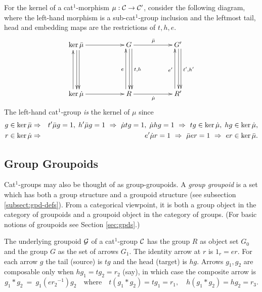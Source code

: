 For the kernel of a cat$^1$-morphism $\mu : \mathcal{C} \to \mathcal{C}'$, 
consider the following diagram, where the left-hand morphism is a 
sub-cat$^1$-group inclusion and the leftmost tail, head and embedding maps 
are the restrictions of $t,h,e$. 
\begin{equation*} \label{eq:cat1kernel}
\vcenter{\xymatrix{
   \ker\barm \ar[rr] \ar[dd]<1.0ex> \ar[dd]<0.2ex> 
     && G \ar[dd]<1.0ex>^{t,h} \ar[dd]<0.2ex> \ar[rr]^{\barm}
          && G' \ar[dd]<1.0ex>^{t',h'} \ar[dd]<0.2ex>  \\
     &&  \\
   \ker\dm \ar[rr] \ar[uu]<1.0ex> 
     && R \ar[uu]<1.0ex>^{e} \ar[rr]_{\dm}
          && R' \ar[uu]<1.0ex>^{e'} 
}}
\end{equation*}
The left-hand cat$^1$-group \emph{is} the kernel of $\mu$ since 
\begin{eqnarray*}
g \in \ker\bar{\mu} 
  & \Rightarrow 
    & t'\bar{\mu} g = 1,\; h'\bar{\mu} g = 1 ~\Rightarrow~ 
      \dot{\mu} tg = 1,\; \dot{\mu} hg = 1 ~\Rightarrow~ 
      tg \in \ker\dot{\mu},\; hg \in \ker\dot{\mu}, \\
r \in \ker\dot{\mu} 
  & \Rightarrow 
    & e'\dot{\mu} r = 1 ~\Rightarrow~ 
      \bar{\mu} er = 1 ~\Rightarrow~ 
      er \in \ker\bar{\mu}. 
\end{eqnarray*}

\subsection{Group Groupoids} \label{subs:gpgpd}  

Cat$^1$-groups may also be thought of as group-groupoids.
A \emph{group groupoid} is a set which has both a group structure and
a groupoid structure (see subsection \ref{subsect:gpd-defs}). 
From a categorical viewpoint, it is both a group object in the
category of groupoids and a groupoid object in the category of groups.
(For basic notions of groupoids see Section \ref{sec:gpds}.) 

The underlying groupoid $\mathcal{G}$  of a cat$^1$-group  $\mathcal{C}$ 
has the group $R$ as object set $G_0$ 
and the group $G$ as the set of arrows $G_1$. 
The identity arrow at  $r$  is  $1_r = er$. 
For each arrow  $g$  the tail (source) is  $tg$ and the head (target) is $hg$. 
Arrows  $g_1,g_2$  are composable only when  $hg_1 = tg_2 = r_2$ (say),
in which case the composite arrow is
\begin{equation} \label{eq:gpgpd-comp}
g_1 * g_2 ~=~ g_1(e{r_2}^{-1})g_2 
\quad\mbox{where}\quad
t(g_1 * g_2) = tg_1 = r_1, \quad
h(g_1 * g_2) = hg_2 = r_3.
\end{equation}

